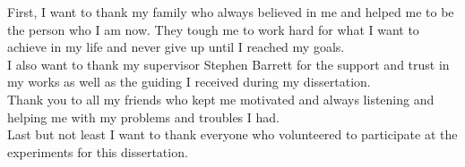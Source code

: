 First, I want to thank my family who always believed in me and helped me to be the person who I am now. 
They tough me to work hard for what I want to achieve in my life and never give up until I reached my goals. 
\\
I also want to thank my supervisor Stephen Barrett for the support and trust in my works as well as the guiding I received during my dissertation. 
\\
Thank you to all my friends who kept me motivated and always listening and helping me with my problems and troubles I had. 
\\
Last but not least I want to thank everyone who volunteered to participate at the experiments for this dissertation. 

